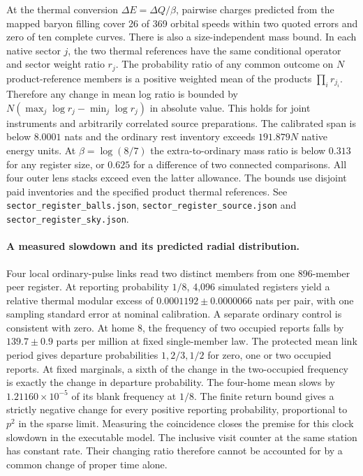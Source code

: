 \documentclass[11pt]{article}
\begin{document}
At the thermal conversion \(\Delta E=\Delta Q/\beta\), pairwise charges
predicted from the mapped baryon filling cover 26 of 369 orbital speeds
within two quoted errors and zero of ten complete curves. There is
also a size-independent mass bound. In each native sector \(j\), the
two thermal references have the same conditional operator and sector
weight ratio \(r_j\). The probability ratio of any common outcome on
\(N\) product-reference members is a positive weighted mean of the
products \(\prod_i r_{j_i}\). Therefore any change in mean log ratio
is bounded by \(N(\max_j\log r_j-\min_j\log r_j)\) in absolute value.
This holds for joint instruments and arbitrarily correlated source
preparations. The calibrated span is below \(8.0001\) nats and the
ordinary rest inventory exceeds \(191.879N\) native energy units.
At \(\beta=\log(8/7)\) the extra-to-ordinary mass ratio is below
\(0.313\) for any register size, or \(0.625\) for a difference of two
connected comparisons. All four outer lens stacks exceed even the
latter allowance. The bounds use disjoint paid inventories and the
specified product thermal references. See
\texttt{sector\_register\_balls.json},
\texttt{sector\_register\_source.json} and
\texttt{sector\_register\_sky.json}.

\paragraph{A measured slowdown and its predicted radial distribution.}
Four local ordinary-pulse links read two distinct members from one
896-member peer register. At reporting probability \(1/8\), 4,096
simulated registers yield a relative thermal modular excess of
\(0.0001192\pm0.0000066\) nats per pair, with one sampling standard
error at nominal calibration. A separate ordinary control is consistent
with zero. At home 8, the frequency of two occupied reports falls by
\(139.7\pm0.9\) parts per million at fixed single-member law.
The protected mean link period gives departure probabilities \(1,2/3,1/2\)
for zero, one or two occupied reports. At fixed marginals, a sixth
of the change in the two-occupied frequency is exactly the change
in departure probability. The four-home mean slows by
\(1.21160\times10^{-5}\) of its blank frequency at \(1/8\). The
finite return bound gives a strictly negative change for every
positive reporting probability, proportional to \(p^2\) in the
sparse limit. Measuring the coincidence closes the premise for this
clock slowdown in the executable model. The inclusive visit counter
at the same station has constant rate. Their changing ratio therefore
cannot be accounted for by a common change of proper time alone.
\end{document}
